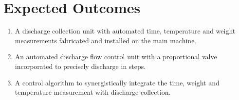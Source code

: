 \section{Expected Outcomes}
\begin{enumerate}
    \item A discharge collection unit with automated time, temperature and weight measurements fabricated and installed on the main machine. 
    \item An automated discharge flow control unit with a proportional valve incorporated to precisely discharge in steps.
    \item A control algorithm to synergistically integrate the time, weight and temperature measurement with discharge collection.
\end{enumerate}





